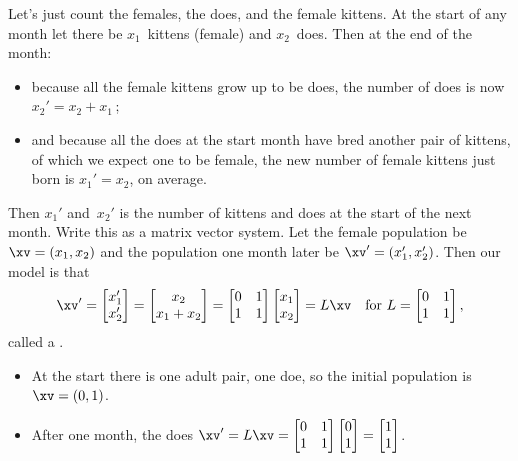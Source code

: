 \begin{example}
Let's just count the females, the does, and the female kittens.
At the start of any month let there be \(x_1\)~kittens (female) and \(x_2\)~does.
Then at the end of the month:
\begin{itemize}
\item because all the female kittens grow up to be does, the number of does is now \(x_2'=x_2+x_1\)\,;
\item and because all the does at the start month have bred another pair of kittens, of which we expect one to be female, the new number of female kittens just born is \(x_1'=x_2\), on average.
\end{itemize}
Then \(x_1'\) and~\(x_2'\) is the number of kittens and does at the start of the next month.
Write this as a matrix vector system.
Let the female population be \(\xv=(x_1,x_2)\) and the population one month later be \(\xv'=(x_1',x_2')\).
Then our model is that
\begin{equation*}
\xv'=\begin{bmatrix} x_1'\\x_2' \end{bmatrix}
=\begin{bmatrix} x_2\\x_1+x_2 \end{bmatrix}
=\begin{bmatrix} 0&1\\1&1 \end{bmatrix}\begin{bmatrix} x_1\\x_2 \end{bmatrix}
=L\xv
\quad\text{for }L=\begin{bmatrix} 0&1\\1&1 \end{bmatrix},
\end{equation*}
called a .
\begin{itemize}
\item At the start there is one adult pair, one doe, so the initial population is \(\xv=(0,1)\).
\item After one month, the does \(\xv'=L\xv=\begin{bmatrix} 0&1\\1&1 \end{bmatrix}\begin{bmatrix} 0\\1 \end{bmatrix}=\begin{bmatrix} 1\\1 \end{bmatrix}\).

\end{itemize}
\end{example}
